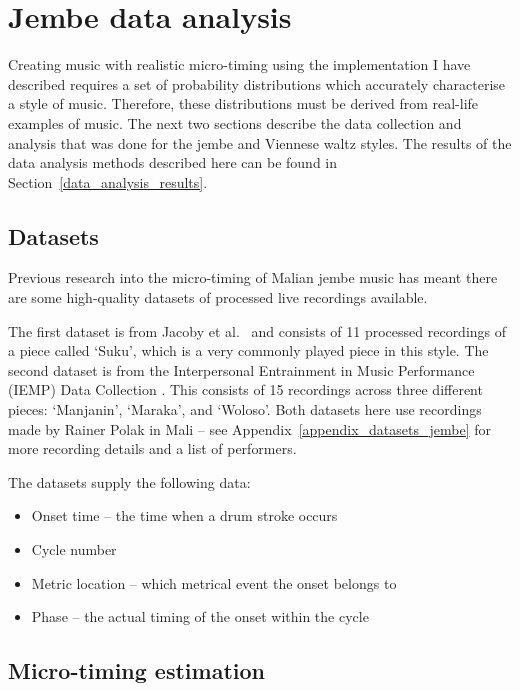 \documentclass[12pt,twoside,openright]{report}
\begin{document}
\section{Jembe data analysis} \label{jembe_data_analysis}

Creating music with realistic micro-timing using the implementation I have
described requires a set of probability distributions which accurately
characterise a style of music. Therefore, these distributions must be derived
from real-life examples of music. The next two sections describe the data
collection and analysis that was done for the jembe and Viennese waltz styles.
The results of the data analysis methods described here can be found in
Section~\ref{data_analysis_results}.


\subsection{Datasets} \label{jembe_datasets}

Previous research into the micro-timing of Malian jembe music has meant there
are some high-quality datasets of processed live recordings available.

The first dataset is from Jacoby et al.\ \cite{jacoby2021} and consists of 11
processed recordings of a piece called `Suku', which is a very commonly played
piece in this style. The second dataset is from the Interpersonal Entrainment in Music Performance
(IEMP) Data Collection \cite{polak2020,clayton2021}. This consists of 15 recordings
across three different pieces: `Manjanin', `Maraka', and `Woloso'. Both datasets here use recordings made by Rainer Polak in Mali -- see Appendix~\ref{appendix_datasets_jembe} for more recording details and a list of performers.

The datasets supply the following data:
\begin{itemize}
	\item Onset time -- the time when a drum stroke occurs
	\item Cycle number
	\item Metric location -- which metrical event the onset belongs to
	\item Phase -- the actual timing of the onset within the cycle
\end{itemize}


\subsection{Micro-timing estimation} \label{jembe_micro-timing}
\end{document}
